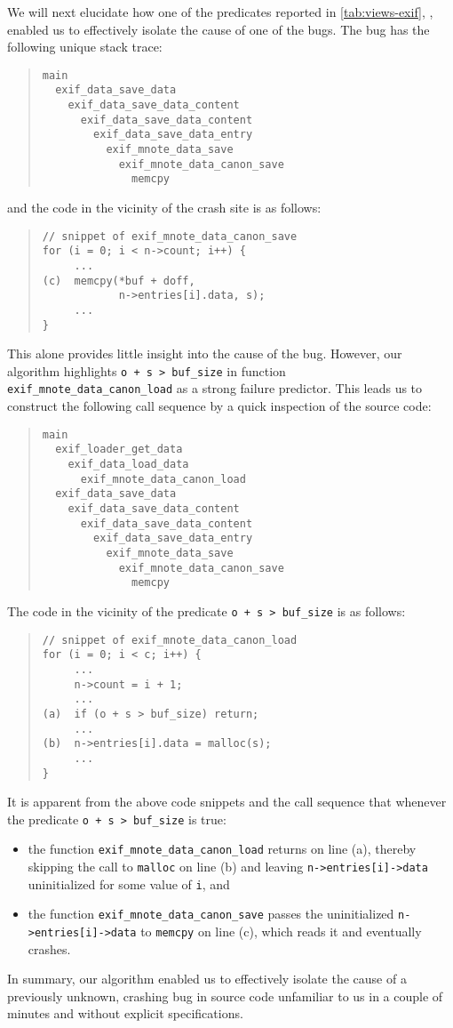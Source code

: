 We will next elucidate how one of the predicates reported in \autoref{tab:views-exif},
\exifpred, enabled us to effectively isolate the cause of one of the bugs.
The bug has the following unique stack trace:
\begin{quote}
\begin{verbatim}
main
  exif_data_save_data
    exif_data_save_data_content
      exif_data_save_data_content
        exif_data_save_data_entry
          exif_mnote_data_save
            exif_mnote_data_canon_save
              memcpy
\end{verbatim}
\end{quote}
and the code in the vicinity of the crash site is as follows:
\begin{quote}
\begin{verbatim}
// snippet of exif_mnote_data_canon_save
for (i = 0; i < n->count; i++) {
     ...
(c)  memcpy(*buf + doff,
            n->entries[i].data, s);
     ...
}
\end{verbatim}
\end{quote}
This alone provides little insight into the cause of the bug.
However, our algorithm highlights {\tt o + s > buf\_size} in function
{\tt exif\_mnote\_data\_canon\_load} as a strong failure predictor.
This leads us to construct the following call sequence by a quick inspection of the
source code:
\begin{quote}
\begin{verbatim}
main
  exif_loader_get_data 
    exif_data_load_data
      exif_mnote_data_canon_load
  exif_data_save_data
    exif_data_save_data_content
      exif_data_save_data_content
        exif_data_save_data_entry
          exif_mnote_data_save
            exif_mnote_data_canon_save
              memcpy
\end{verbatim}
\end{quote}
The code in the vicinity of the predicate {\tt o + s > buf\_size} is as follows:
\begin{quote}
\begin{verbatim}
// snippet of exif_mnote_data_canon_load
for (i = 0; i < c; i++) {
     ...
     n->count = i + 1;
     ...
(a)  if (o + s > buf_size) return;
     ...
(b)  n->entries[i].data = malloc(s); 
     ...
}
\end{verbatim}
\end{quote}
It is apparent from the above code snippets and the
call sequence that whenever the predicate {\tt o + s > buf\_size} is true:
\begin{itemize}
\item
the function {\tt exif\_mnote\_data\_canon\_load} returns on line (a),
thereby skipping the call to {\tt malloc} on line (b) and leaving {\tt n->entries[i]->data}
uninitialized for some value of {\tt i}, and
\item
the function {\tt exif\_mnote\_data\_canon\_save} passes the uninitialized
{\tt n->entries[i]->data} to {\tt memcpy} on line (c), which reads it
and eventually crashes.
\end{itemize}
In summary, our algorithm enabled us to effectively isolate
the cause of a previously unknown, crashing bug in source code unfamiliar to us in
a couple of minutes and without explicit specifications.
